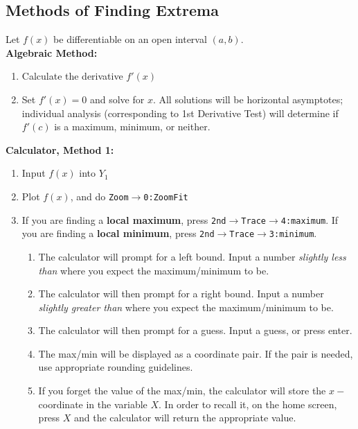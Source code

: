\documentclass[notes]{subfiles}
\begin{document}
	\subsection*{Methods of Finding Extrema}
		Let $f(x)$ be differentiable on an open interval $(a,b)$.\\
		
		\textbf{Algebraic Method:}
			\begin{enumerate}
				\item Calculate the derivative $f'(x)$
				\item Set $f'(x) = 0$ and solve for $x$.  All solutions will be horizontal asymptotes; individual analysis (corresponding to 1st Derivative Test) will determine if $f'(c)$ is a maximum, minimum, or neither.
			\end{enumerate}
			
		\textbf{Calculator, Method 1:}
			\begin{enumerate}
				\item Input $f(x)$ into $Y_1$
				\item Plot $f(x)$, and do \texttt{Zoom}$\rightarrow$\texttt{0:ZoomFit}
				\item If you are finding a \textbf{local maximum}, press \texttt{2nd$\to$Trace$\to$4:maximum}.  If you are finding a \textbf{local minimum}, press \texttt{2nd$\to$Trace$\to$3:minimum}.
					\begin{enumerate}
						\item The calculator will prompt for a left bound.  Input a number \emph{slightly less than} where you expect the maximum/minimum to be.
						\item The calculator will then prompt for a right bound.  Input a number \emph{slightly greater than} where you expect the maximum/minimum to be.
						\item The calculator will then prompt for a guess.  Input a guess, or press enter.
						\item The max/min will be displayed as a coordinate pair.  If the pair is needed, use appropriate rounding guidelines.
						\item If you forget the value of the max/min, the calculator will store the $x-$coordinate in the variable $X$.  In order to recall it, on the home screen, press $X$ and the calculator will return the appropriate value.  
					\end{enumerate}
			\end{enumerate}
				\newpage
				
\end{document}
